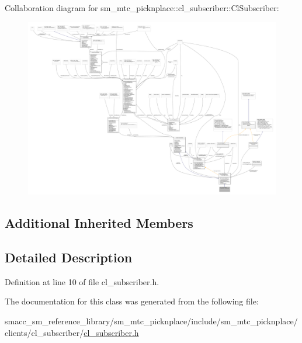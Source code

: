 Collaboration diagram for sm\+\_\+mtc\+\_\+picknplace\+:\+:cl\+\_\+subscriber\+:\+:Cl\+Subscriber\+:
\nopagebreak
\begin{figure}[H]
\begin{center}
\leavevmode
\includegraphics[width=350pt]{classsm__mtc__picknplace_1_1cl__subscriber_1_1ClSubscriber__coll__graph}
\end{center}
\end{figure}
\subsection*{Additional Inherited Members}


\subsection{Detailed Description}


Definition at line 10 of file cl\+\_\+subscriber.\+h.



The documentation for this class was generated from the following file\+:\begin{DoxyCompactItemize}
\item 
smacc\+\_\+sm\+\_\+reference\+\_\+library/sm\+\_\+mtc\+\_\+picknplace/include/sm\+\_\+mtc\+\_\+picknplace/clients/cl\+\_\+subscriber/\hyperlink{sm__mtc__picknplace_2include_2sm__mtc__picknplace_2clients_2cl__subscriber_2cl__subscriber_8h}{cl\+\_\+subscriber.\+h}\end{DoxyCompactItemize}
